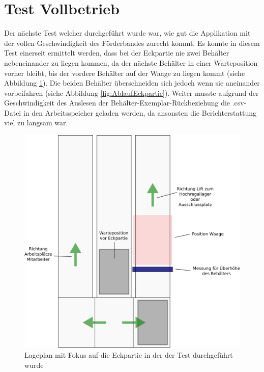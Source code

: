 \documentclass[parskip=full, a4paper]{scrartcl}
\begin{document}
\section{Test Vollbetrieb}
Der nächste Test welcher durchgeführt wurde war, wie gut die Applikation mit der vollen Geschwindigkeit des Förderbandes zurecht kommt. Es konnte in diesem Test einerseit ermittelt werden, dass bei der Eckpartie nie zwei Behälter nebeneinander zu liegen kommen, da der nächste Behälter in einer Warteposition vorher bleibt, bis der vordere Behälter auf der Waage zu liegen kommt (siehe Abbildung \ref{fig:PlanEckpartie}). Die beiden Behälter überschneiden sich jedoch wenn sie aneinander vorbeifahren (siehe Abbildung \ref{fig:AblaufEckpartie}). Weiter musste aufgrund der Geschwindigkeit des Auslesen der Behälter-Exemplar-Rückbeziehung die .csv-Datei in den Arbeitsspeicher geladen werden, da ansonsten die Berichterstattung viel zu langsam war.

\begin{figure}[htb]
	\centering
	\includegraphics[keepaspectratio,width=0.6\linewidth]{img/PlanEckpartie.png}
	\caption{Lageplan mit Fokus auf die Eckpartie in der der Test durchgeführt wurde}
	\label{fig:PlanEckpartie}
\end{figure}
\end{document}

